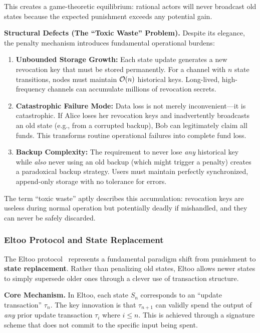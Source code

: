 This creates a game-theoretic equilibrium: rational actors will never broadcast old states because the expected punishment exceeds any potential gain.

\textbf{Structural Defects (The ``Toxic Waste'' Problem).} Despite its elegance, the penalty mechanism introduces fundamental operational burdens:
\begin{enumerate}
    \item \textbf{Unbounded Storage Growth:} Each state update generates a new revocation key that must be stored permanently. For a channel with $n$ state transitions, nodes must maintain $\mathcal{O}(n)$ historical keys. Long-lived, high-frequency channels can accumulate millions of revocation secrets.
    
    \item \textbf{Catastrophic Failure Mode:} Data loss is not merely inconvenient---it is catastrophic. If Alice loses her revocation keys and inadvertently broadcasts an old state (e.g., from a corrupted backup), Bob can legitimately claim all funds. This transforms routine operational failures into complete fund loss.
    
    \item \textbf{Backup Complexity:} The requirement to never lose \textit{any} historical key while \textit{also} never using an old backup (which might trigger a penalty) creates a paradoxical backup strategy. Users must maintain perfectly synchronized, append-only storage with no tolerance for errors.
\end{enumerate}

The term ``toxic waste'' aptly describes this accumulation: revocation keys are useless during normal operation but potentially deadly if mishandled, and they can never be safely discarded.

\subsubsection{Eltoo Protocol and State Replacement}

The Eltoo protocol~\cite{decker2018eltoo} represents a fundamental paradigm shift from punishment to \textbf{state replacement}. Rather than penalizing old states, Eltoo allows newer states to simply supersede older ones through a clever use of transaction structure.

\textbf{Core Mechanism.} In Eltoo, each state $S_n$ corresponds to an ``update transaction'' $\tau_n$. The key innovation is that $\tau_{n+1}$ can validly spend the output of \textit{any} prior update transaction $\tau_i$ where $i \leq n$. This is achieved through a signature scheme that does not commit to the specific input being spent.


